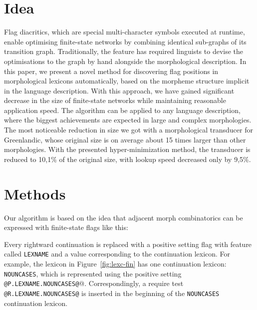 \documentclass[final]{beamer}
\author{Senka Drobac$^1$, \\ Krister Lind\'{e}n$^1$, \\ Miikka Silfverberg$^1$, \\ Tommi A Pirinen$^2$}
\institute{$^1$University of Helsinki \\ Department of Modern Languages, PO Box 24 %
\\ $^2$University of Helsinki \\ Department of Speech Sciences, PO Box 9}
\begin{document}
\begin{poster}


\newcolumn


\section{Idea}
\justifying
Flag diacritics, which are special multi-character symbols executed at runtime, enable optimising finite-state networks by
    combining identical sub-graphs of its transition
    graph. Traditionally, the feature has required linguists to devise
    the optimisations to the graph by hand alongside the morphological
    description. In this paper, we present a novel method for
    discovering flag positions in morphological lexicons automatically,
    based on the morpheme structure implicit in the language
    description. With this approach, we have gained significant
    decrease in the size of finite-state networks while maintaining reasonable application 
    speed. The algorithm can be applied to any language description, where the biggest achievements are expected in large and complex morphologies. The most noticeable reduction in size we got with a morphological transducer for Greenlandic, whose original size is on average about 15 times larger than other morphologies. With the presented hyper-minimization method, the transducer is reduced to 10,1\% of the original size, with lookup speed decreased only by 9,5\%. 

\section{Methods}
\justifying
Our algorithm is based on the idea that adjacent morph combinatorics can be expressed with finite-state flags like this:

Every rightward continuation is replaced with a positive setting flag
with feature called \texttt{LEXNAME} and a value corresponding to the
continuation lexicon. For example, the lexicon in
Figure~\ref{fig:lexc-fin} has one continuation lexicon: \texttt{NOUNCASES}, which is represented using the positive setting \verb+@P.LEXNAME.NOUNCASES@+@. Correspondingly, a require test \verb+@R.LEXNAME.NOUNCASES@+ is inserted in the beginning of the \texttt{NOUNCASES} continuation lexicon.

\end{poster}
\end{document}
